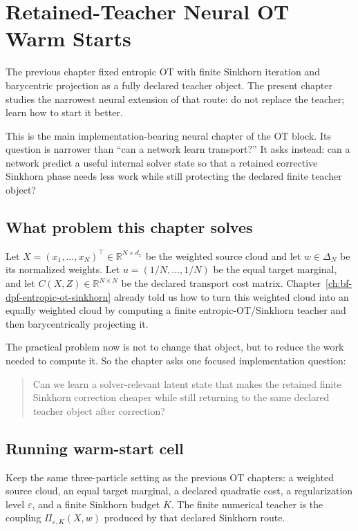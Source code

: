 \chapter{Retained-Teacher Neural OT Warm Starts}
\label{ch:bf-dpf-learned-ot}

The previous chapter fixed entropic OT with finite Sinkhorn iteration and
barycentric projection as a fully declared teacher object.  The present chapter
studies the narrowest neural extension of that route: do not replace the teacher;
learn how to start it better.

This is the main implementation-bearing neural chapter of the OT block.  Its
question is narrower than ``can a network learn transport?''  It asks instead:
can a network predict a useful internal solver state so that a retained
corrective Sinkhorn phase needs less work while still protecting the declared
finite teacher object?

\section{What problem this chapter solves}
\label{sec:bf-learned-ot-objects}

Let \(X=(x_1,\ldots,x_N)^\top\in\mathbb R^{N\times d_x}\) be the weighted
source cloud and let \(w\in\Delta_N\) be its normalized weights.  Let
\(u=(1/N,\ldots,1/N)\) be the equal target marginal, and let
\(C(X,Z)\in\mathbb R^{N\times N}\) be the declared transport cost matrix.
Chapter~\ref{ch:bf-dpf-entropic-ot-sinkhorn} already told us how to turn this
weighted cloud into an equally weighted cloud by computing a finite
entropic-OT/Sinkhorn teacher and then barycentrically projecting it.

The practical problem now is not to change that object, but to reduce the work
needed to compute it.  So the chapter asks one focused implementation question:
\begin{quote}
Can we learn a solver-relevant latent state that makes the retained finite
Sinkhorn correction cheaper while still returning to the same declared teacher
object after correction?
\end{quote}

\section{Running warm-start cell}
\label{sec:bf-learned-ot-running-cell}

Keep the same three-particle setting as the previous OT chapters: a weighted
source cloud, an equal target marginal, a declared quadratic cost, a
regularization level \(\varepsilon\), and a finite Sinkhorn budget \(K\).  The
finite numerical teacher is the coupling
\(\Pi_{\varepsilon,K}(X,w)\) produced by that declared Sinkhorn route.

